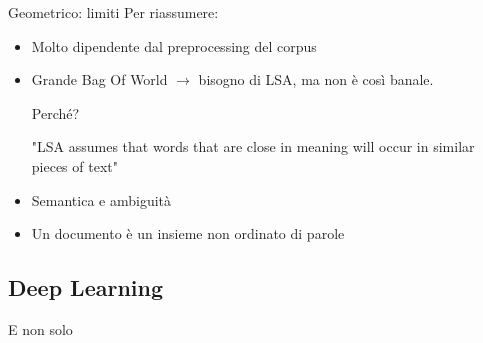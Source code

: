 \documentclass[british]{beamer}
\begin{document}
\begin{frame}{Geometrico: limiti}
	Per riassumere:
	\begin{itemize}
		\item Molto dipendente dal preprocessing del corpus
		\item Grande Bag Of World $\rightarrow$ bisogno di LSA, ma non \`{e} così banale.
		
		Perch\'{e}?
		\begin{displayquote}
			"LSA assumes that words that are close in meaning will occur in similar pieces of text"
		\end{displayquote}
		\item Semantica e ambiguit\`{a}
		\item Un documento \`{e} un insieme \alert{non ordinato} di parole  
	\end{itemize}
\end{frame}
	
\subsection{Deep Learning}
	
\begin{frame}{E non solo}
	\begin{figure}[!hf]
		\centering
	\end{figure}
\end{frame}
	
\end{document}
